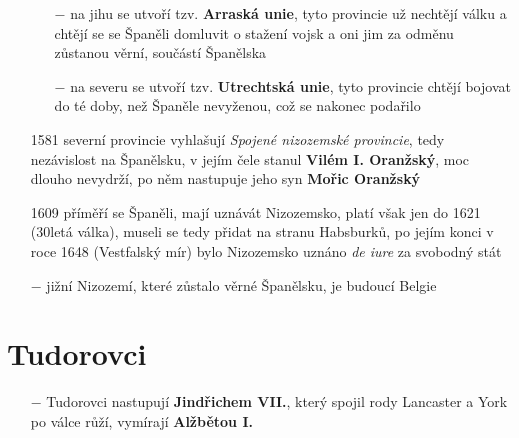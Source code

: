 \documentclass{article}
\begin{document}
\begin{itemize}
    \begin{itemize}
        \vspace{-0.5em}
        \setlength\itemsep{0.15em}
        \item[$-$] na jihu se utvoří tzv. \textbf{Arraská unie}, tyto provincie už nechtějí válku a chtějí se se Španěli domluvit o stažení vojsk a oni jim za odměnu zůstanou věrní, součástí Španělska
        \item[$-$] na severu se utvoří tzv. \textbf{Utrechtská unie}, tyto provincie chtějí bojovat do té doby, než Španěle nevyženou, což se nakonec podařilo
    \end{itemize}
    \item[1581] severní provincie vyhlašují \textit{Spojené nizozemské provincie}, tedy nezávislost na Španělsku, v jejím čele stanul \textbf{Vilém I. Oranžský}, moc dlouho nevydrží, po něm nastupuje jeho syn \textbf{Mořic Oranžský}
    \item[1609] příměří se Španěli, mají uznávát Nizozemsko, platí však jen do 1621 (30letá válka), museli se tedy přidat na stranu Habsburků, po jejím konci v roce 1648 (Vestfalský mír) bylo Nizozemsko uznáno \textit{de iure} za svobodný stát
    \item[$-$] jižní Nizozemí, které zůstalo věrné Španělsku, je budoucí Belgie
\end{itemize}

\section*{Tudorovci}

\begin{itemize}
    \vspace{-0.5em}
    \setlength\itemsep{0.15em}
    \item[$-$] Tudorovci nastupují \textbf{Jindřichem VII.}, který spojil rody Lancaster a York po válce růží, vymírají \textbf{Alžbětou I.}
\end{itemize}
\end{document}
